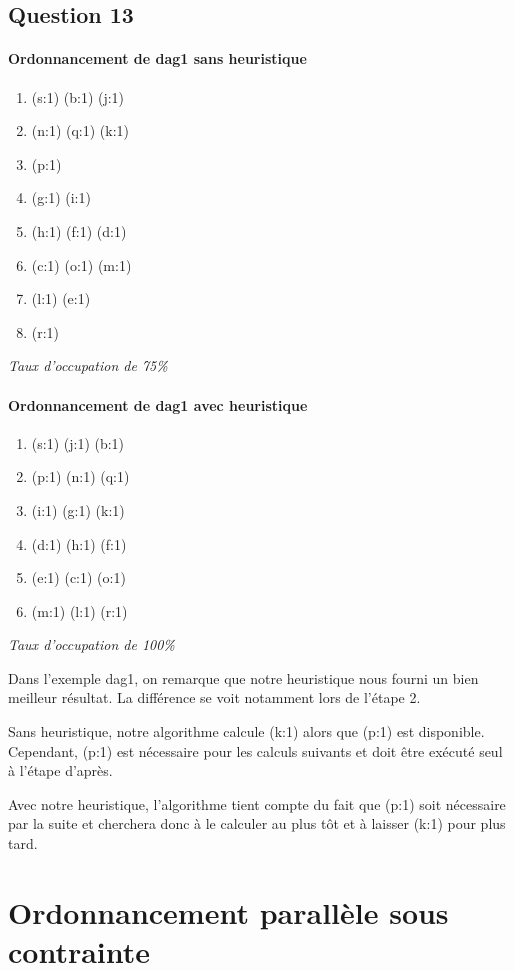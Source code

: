 \documentclass[11pt]{article}
\newenvironment{titledenumerate}[1]
  {\paragraph{#1} \begin{enumerate}}
  {\end{enumerate}}
\begin{document}
  \subsection{Question 13}
    \begin{multicols}{2}
      \begin{titledenumerate}{Ordonnancement de dag1 sans heuristique}
        \item (s:1) (b:1) (j:1)
        \item (n:1) (q:1) (k:1)
        \item (p:1)
        \item (g:1) (i:1)
        \item (h:1) (f:1) (d:1)
        \item (c:1) (o:1) (m:1)
        \item (l:1) (e:1)
        \item (r:1)
      \end{titledenumerate}
      \emph{Taux d'occupation de 75\%}

      \begin{titledenumerate}{Ordonnancement de dag1 avec heuristique}
        \item (s:1) (j:1) (b:1)
        \item (p:1) (n:1) (q:1)
        \item (i:1) (g:1) (k:1)
        \item (d:1) (h:1) (f:1)
        \item (e:1) (c:1) (o:1)
        \item (m:1) (l:1) (r:1)
      \end{titledenumerate}
      \emph{Taux d'occupation de 100\%}
    \end{multicols}

    Dans l'exemple dag1, on remarque que notre heuristique nous fourni un bien
    meilleur résultat. La différence se voit notamment lors de l'étape 2.

    Sans heuristique, notre algorithme calcule (k:1) alors que (p:1) est
    disponible. Cependant, (p:1) est nécessaire pour les calculs suivants et
    doit être exécuté seul à l'étape d'après.

    Avec notre heuristique, l'algorithme tient compte du fait que (p:1) soit
    nécessaire par la suite et cherchera donc à le calculer au plus tôt et à
    laisser (k:1) pour plus tard.

\section{Ordonnancement parallèle sous contrainte}
\end{document}
